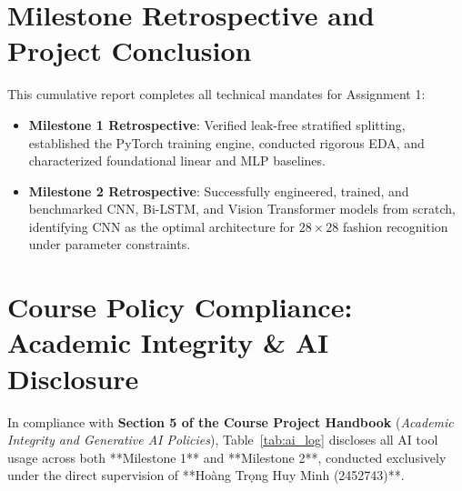 \documentclass[11pt, a4paper]{article}
\begin{document}
\section{Milestone Retrospective and Project Conclusion}
\label{sec:conclusion}

This cumulative report completes all technical mandates for Assignment 1:
\begin{itemize}[noitemsep]
  \item \textbf{Milestone 1 Retrospective}: Verified leak-free stratified splitting, established the PyTorch training engine, conducted rigorous EDA, and characterized foundational linear and MLP baselines.
  \item \textbf{Milestone 2 Retrospective}: Successfully engineered, trained, and benchmarked CNN, Bi-LSTM, and Vision Transformer models from scratch, identifying CNN as the optimal architecture for $28 \times 28$ fashion recognition under parameter constraints.
\end{itemize}

\newpage
\section{Course Policy Compliance: Academic Integrity \& AI Disclosure}
\label{sec:ai_disclosure}

In compliance with \textbf{Section 5 of the Course Project Handbook} (\textit{Academic Integrity and Generative AI Policies}), Table~\ref{tab:ai_log} discloses all AI tool usage across both **Milestone 1** and **Milestone 2**, conducted exclusively under the direct supervision of **Hoàng Trọng Huy Minh (2452743)**.
\end{document}
